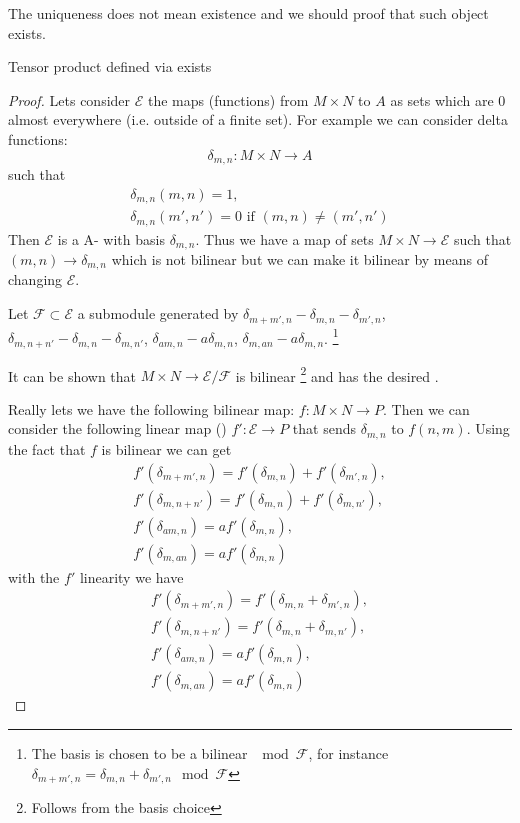 The uniqueness does not mean existence and we should proof that such
object exists.
\begin{lemma}
  Tensor product defined via  exists
  \begin{proof}
    Lets consider $\mathcal{E}$ the maps (functions) from
    $M \times N$ to $A$ as sets which are $0$ almost everywhere
    (i.e. outside of a finite set). For example we can consider delta
    functions:
    \[
    \delta_{m,n} : M \times N \to A
    \]
    such that
    \begin{eqnarray}
      \delta_{m,n}(m,n) = 1,
      \nonumber \\
      \delta_{m,n}(m',n') = 0 \mbox{ if } (m,n) \ne (m',n')
      \nonumber 
    \end{eqnarray}
    Then $\mathcal{E}$ is a A- with basis
    $\delta_{m,n}$. Thus we have a map of sets $M \times N \to
    \mathcal{E}$ such that $(m,n) \to \delta_{m,n}$ which is not bilinear
    but we can make it bilinear by means of changing $\mathcal{E}$.
    
    Let $\mathcal{F} \subset \mathcal{E}$ a submodule generated by
    $\delta_{m+m',n} - \delta_{m,n} - \delta_{m',n}$,
    $\delta_{m,n+n'} - \delta_{m,n} - \delta_{m,n'}$,
    $\delta_{am,n} - a\delta_{m,n}$,
    $\delta_{m,an} - a\delta_{m,n}$.
    \footnote{
      The basis is chosen to be a bilinear $\mod \mathcal{F}$, for instance
      $\delta_{m+m',n} = \delta_{m,n} + \delta_{m',n} \mod \mathcal{F}$
    }
    
    It can be shown that $M \times N \to \mathcal{E}/\mathcal{F}$ is
    bilinear
    \footnote{
      Follows from the basis choice
    }
    and has the desired .

    Really lets we have the following bilinear map:
    $f: M \times N \to P$. Then we can consider the following linear
    map ()
    $f': \mathcal{E} \to P$ that sends $\delta_{m,n}$ to
    $f(n,m)$. Using the fact that $f$ is bilinear we can get
    \begin{eqnarray}
      f'(\delta_{m+m',n}) = f'(\delta_{m,n}) + f'(\delta_{m',n}),
      \nonumber \\
      f'(\delta_{m,n+n'}) = f'(\delta_{m,n}) + f'(\delta_{m,n'}),
      \nonumber \\
      f'(\delta_{am,n}) =  a f'(\delta_{m,n}),
      \nonumber \\
      f'(\delta_{m,an}) = a f'(\delta_{m,n})
      \nonumber
    \end{eqnarray}
    with the $f'$ linearity we have
    \begin{eqnarray}
      f'(\delta_{m+m',n}) = f'(\delta_{m,n} + \delta_{m',n}),
      \nonumber \\
      f'(\delta_{m,n+n'}) = f'(\delta_{m,n} + \delta_{m,n'}),
      \nonumber \\
      f'(\delta_{am,n}) =  a f'(\delta_{m,n}),
      \nonumber \\
      f'(\delta_{m,an}) = a f'(\delta_{m,n})
      \nonumber
    \end{eqnarray}


\end{proof}
\end{lemma}
